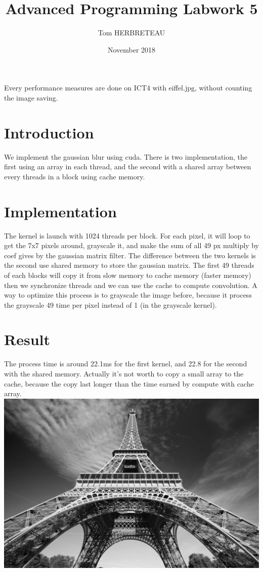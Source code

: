 \documentclass{article}
\title{Advanced Programming Labwork 5}
\author{Tom HERBRETEAU }
\date{November 2018}
\begin{document}
\maketitle
Every performance measures are done on ICT4 with eiffel.jpg, without counting the image saving.
\section{Introduction}
We implement the gaussian blur using cuda. There is two implementation, the first using an array in each thread, and the second with a shared array between every threads in a block using cache memory.
\section{Implementation}
The kernel is launch with 1024 threads per block. For each pixel, it will loop to get the 7x7 pixels around, grayscale it, and make the sum of all 49 px multiply by coef gives by the gaussian matrix filter.
\newline
The difference between the two kernels is the second use shared memory to store the gaussian matrix. The first 49 threads of each blocks will copy it from slow memory to cache memory (faster memory) then we synchronize threads and we can use the cache to compute convolution.
\newline
A way to optimize this process is to grayscale the image before, because it process the grayscale 49 time per pixel instead of 1 (in the grayscale kernel).

\section{Result}
The process time is around 22.1ms for the first kernel, and 22.8 for the second with the shared memory. Actually it's not worth to copy a small array to the cache, because the copy last longer than the time earned by compute with cache array.
\newline
\includegraphics[width=\textwidth]{labwork5-gpu-out.jpg}

\end{document}

